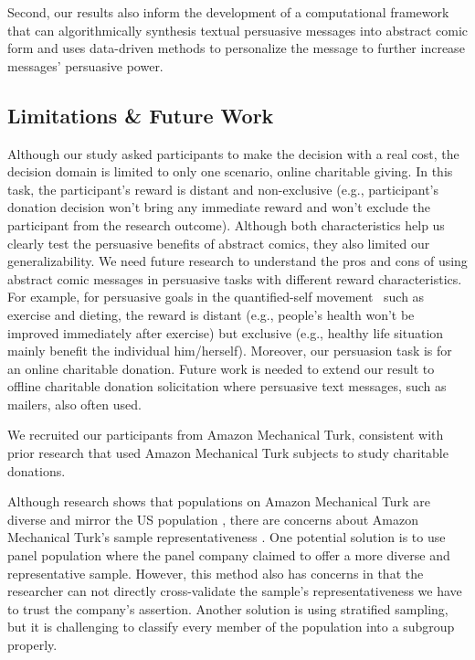Second, our results also inform the development of a computational framework that can algorithmically synthesis textual persuasive messages into abstract comic form and uses data-driven methods to personalize the message to further increase messages' persuasive power. 

\subsection{Limitations \& Future Work}
\begin{description}[leftmargin=\parindent,topsep=0pt,partopsep=3pt,parsep=0pt,itemsep=3pt, listparindent=\parindent]
\item[Distant and Non-exclusive Task:]  Although our study asked participants to make the decision with a real cost, the decision domain is limited to only one scenario, online charitable giving. In this task, the participant's reward is distant and non-exclusive (e.g., participant's donation decision won't bring any immediate reward and won't exclude the participant from the research outcome). Although both characteristics help us clearly test the persuasive benefits of abstract comics, they also limited our generalizability. We need future research to understand the pros and cons of using abstract comic messages in persuasive tasks with different reward characteristics. For example, for persuasive goals in the quantified-self movement~\cite{Epstein2014,Choe2014} such as exercise and dieting, the reward is distant (e.g., people's health won't be improved immediately after exercise) but exclusive (e.g., healthy life situation mainly benefit the individual him/herself). Moreover, our persuasion task is for an online charitable donation. Future work is needed to extend our result to offline charitable donation solicitation where persuasive text messages, such as mailers, also often used. 
\item[Study on Amazon Mechanical Turk:] We recruited our participants from Amazon Mechanical Turk, consistent with prior research \cite{lee2013does,saunders2016no,sussman2015framing,arechar2017turking,branas2018gender} that used Amazon Mechanical Turk subjects to study charitable donations. 


Although research shows that populations on Amazon Mechanical Turk are diverse and mirror the US population \cite{buhrmester2011amazon,behrend2011viability,berinsky2012evaluating}, there are concerns about Amazon Mechanical Turk's sample representativeness \cite{landers2015inconvenient,paolacci2010running}. One potential solution is to use panel population where the panel company claimed to offer a more diverse and representative sample.
However, this method also has concerns in that the researcher can not directly cross-validate the sample's representativeness we have to trust the company's assertion. Another solution is using stratified sampling, but it is challenging to classify every member of the population into a subgroup properly. 


\end{description}
